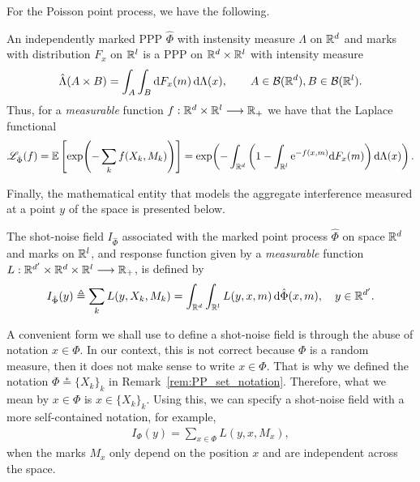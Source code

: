For the Poisson point process, we have the following.
\begin{theorem}
    An independently marked PPP $\hat\Phi$ with instensity measure $\Lambda$ on ${\mathbb R}^d$ and marks with distribution $F_x$ on ${\mathbb R}^l$ is a PPP on ${\mathbb R}^d\times{\mathbb R}^l$ with intensity measure
    \begin{align*}
        \hat\Lambda(A\times B) = \int_A \int_B \mathrm{d} F_x(m)\,\mathrm{d}\Lambda(x), \qquad A\in\mathcal{B}({\mathbb R}^d), B\in\mathcal{B}({\mathbb R}^l).
    \end{align*}
    Thus, for a \textit{measurable} function $f:{\mathbb R}^d\times{\mathbb R}^l\longrightarrow{\mathbb R}_+$ we have that the Laplace functional
    \begin{align*}
        \mathscr{L}_{\hat\Phi}(f) = {\mathbb E}\left[ \exp\!\left( -\sum_k f(X_k,M_k) \right) \right] = \exp\!\left( - \int_{{\mathbb R}^d}\left(1 - \int_{{\mathbb R}^l} \mathrm{e}^{-f(x,m)} \mathrm{d} F_x(m) \right) \mathrm{d}\Lambda(x)\right).
    \end{align*}
\end{theorem}

Finally, the mathematical entity that models the aggregate interference measured at a point $y$ of the space is presented below.
%
\begin{definition}
    The shot-noise field $I_{\hat\Phi}$ associated with the marked point process $\hat\Phi$ on space ${\mathbb R}^d$ and marks on ${\mathbb R}^l$, and response function given by a \textit{measurable} function $L:{\mathbb R}^{d'}\times{\mathbb R}^d\times{\mathbb R}^l\longrightarrow{\mathbb R}_+$, is defined by
    \begin{align*}
        I_{\hat\Phi}(y) \triangleq \sum_k L(y,X_k,M_k) = \int_{{\mathbb R}^d}\int_{{\mathbb R}^l} L(y,x,m) \,\mathrm{d}\hat\Phi(x,m),\quad y\in{\mathbb R}^{d'}.
    \end{align*}
\end{definition}

\begin{remark}
    A convenient form we shall use to define a shot-noise field is through the abuse of notation $x\in\Phi$. In our context, this is not correct because $\Phi$ is a random measure, then it does not make sense to write $x\in\Phi$.
    That is why we defined the notation $\Phi\stackrel{*}{=}\{X_k\}_k$ in Remark~\ref{rem:PP_set_notation}. Therefore, what we mean by $x\in\Phi$ is $x\in\{X_k\}_k$.
    Using this, we can specify a shot-noise field with a more self-contained notation, for example,
    \begin{align*}
        I_{\Phi}(y) = \sum_{x\in\Phi} L(y,x,M_x),
    \end{align*}
    when the marks $M_x$ only depend on the position $x$ and are independent across the space.
\end{remark}

